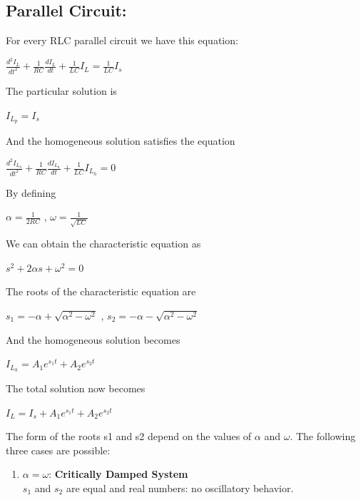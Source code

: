 \documentclass[a4paper,twoside]{report}
\begin{document}
        \subsection*{Parallel Circuit:}
        {
            For every RLC parallel circuit we have this equation:
            \begin{center}
                $\frac{d^2 I_L}{d t^2} + \frac{1}{RC}\frac{d I_L}{d t} + \frac{1}{LC}I_L = \frac{1}{LC}I_s$
            \end{center}
            The particular solution is
            \begin{center}
                $I_{L_p} = I_s$
            \end{center}
            And the homogeneous solution satisfies the equation
            \begin{center}
                $\frac{d^2 I_{L_h}}{d t^2} + \frac{1}{RC}\frac{d I_{L_h}}{d t} + \frac{1}{LC}I_{L_h} = 0$
            \end{center}
            By defining
            \begin{center}
                $\alpha = \frac{1}{2RC}$ ,
                $\omega = \frac{1}{\sqrt{LC}}$
            \end{center}
            We can obtain the characteristic equation as
            \begin{center}
                $s^2 + 2\alpha s + \omega ^ 2 = 0$
            \end{center}
            The roots of the characteristic equation are
            \begin{center}
                $s_1 = -\alpha + \sqrt{\alpha ^ 2 - \omega ^ 2}$ ,
                $s_2 = -\alpha - \sqrt{\alpha ^ 2 - \omega ^ 2}$
            \end{center}
            And the homogeneous solution becomes
            \begin{center}
                $I_{L_h} = A_1e^{s_1t} + A_2e^{s_2t}$
            \end{center}
            The total solution now becomes
            \begin{center}
                $I_L = I_s + A_1e^{s_1t} + A_2e^{s_2t}$
            \end{center}
            The form of the roots s1 and s2 depend on the values of
            $\alpha$ and $\omega$. The following three cases are possible:
            \begin{enumerate}
                \item
                    $\alpha = \omega$: \textbf{Critically Damped System} \\
                    $s_1$ and $s_2$ are equal and real numbers: no oscillatory behavior.


\end{enumerate}}
\end{document}
